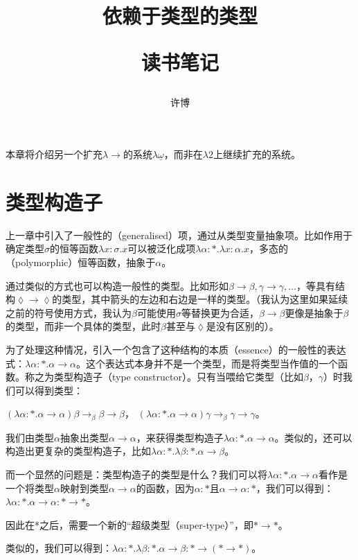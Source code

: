\documentclass[UTF8]{article}
\title{依赖于类型的类型\\[2ex]\begin{large}读书笔记\end{large}}
\author{许博}
\date{}
\begin{document}
\maketitle
		本章将介绍另一个扩充$\lambda{\rightarrow}$的系统$\lambda{\underline{\omega}}$，而非在$\lambda{2}$上继续扩充的系统。

	\section{类型构造子}
		上一章中引入了一般性的（generalised）项，通过从类型变量抽象项。比如作用于确定类型$\sigma$的恒等函数$\lambda x:\sigma.x$可以被泛化成项$\lambda\alpha:*.\lambda x:\alpha.x$，多态的（polymorphic）恒等函数，抽象于$\alpha$。
		
		通过类似的方式也可以构造一般性的类型。比如形如$\beta\rightarrow\beta,\gamma\rightarrow\gamma,...$，等具有结构$\lozenge\rightarrow\lozenge$的类型，其中箭头的左边和右边是一样的类型。（我认为这里如果延续之前的符号使用方式，我认为$\beta$可能使用$\sigma$等替换更为合适，$\beta\rightarrow\beta$更像是抽象于$\beta$的类型，而非一个具体的类型，此时$\beta$甚至与$\lozenge$是没有区别的）。
		
		为了处理这种情况，引入一个包含了这种结构的本质（essence）的一般性的表达式：$\lambda\alpha:*.\alpha\rightarrow\alpha$。这个表达式本身并不是一个类型，而是将类型当作值的一个函数。称之为类型构造子（type constructor）。只有当喂给它类型（比如$\beta$，$\gamma$）时我们可以得到类型：
		
		$(\lambda\alpha:*.\alpha\rightarrow\alpha)\beta\rightarrow_\beta\beta\rightarrow\beta$，
		$(\lambda\alpha:*.\alpha\rightarrow\alpha)\gamma\rightarrow_\beta\gamma\rightarrow\gamma$。
		
		我们由类型$\alpha$抽象出类型$\alpha\rightarrow\alpha$，来获得类型构造子$\lambda\alpha:*.\alpha\rightarrow\alpha$。类似的，还可以构造出更复杂的类型构造子，比如$\lambda\alpha:*.\lambda\beta:*.\alpha\rightarrow\beta$。
		
		而一个显然的问题是：类型构造子的类型是什么？我们可以将$\lambda\alpha:*.\alpha\rightarrow\alpha$看作是一个将类型$\alpha$映射到类型$\alpha\rightarrow\alpha$的函数，因为$\alpha:*$且$\alpha\rightarrow\alpha:*$，我们可以得到：$\lambda\alpha:*.\alpha\rightarrow\alpha:*\rightarrow*$。
		
		因此在*之后，需要一个新的“超级类型（super-type）”，即$*\rightarrow*$。
		
		类似的，我们可以得到：$\lambda\alpha:*.\lambda\beta:*.\alpha\rightarrow\beta:*\rightarrow(*\rightarrow*)$。
		
\end{document}
